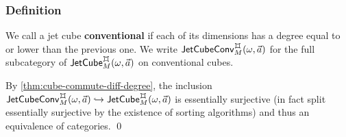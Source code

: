 \documentclass[a4paper]{memoir}
\begin{document}
\subsubsection{Definition} \label{sec:jetcubes:calculus:def}
\begin{definition} \label{def:conv-jet-cube-cat}
	We call a jet cube \textbf{conventional} if each of its dimensions has a degree equal to or lower than the previous one.
	We write $\convjetcube{\myorix}{\mycubex}{M}{\vec a}$ for the full subcategory of $\jetcube{\myorix}{\mycubex}{M}{\vec a}$ on conventional cubes.
\end{definition}
\begin{corollary} \label{thm:conv-jet-cube-cat}
	By \cref{thm:cube-commute-diff-degree}, the inclusion $\convjetcube{\myorix}{\mycubex}{M}{\vec a} \hookrightarrow \jetcube{\myorix}{\mycubex}{M}{\vec a}$ is essentially surjective (in fact split essentially surjective by the existence of sorting algorithms) and thus an equivalence of categories. \qed
\end{corollary}
\end{document}
